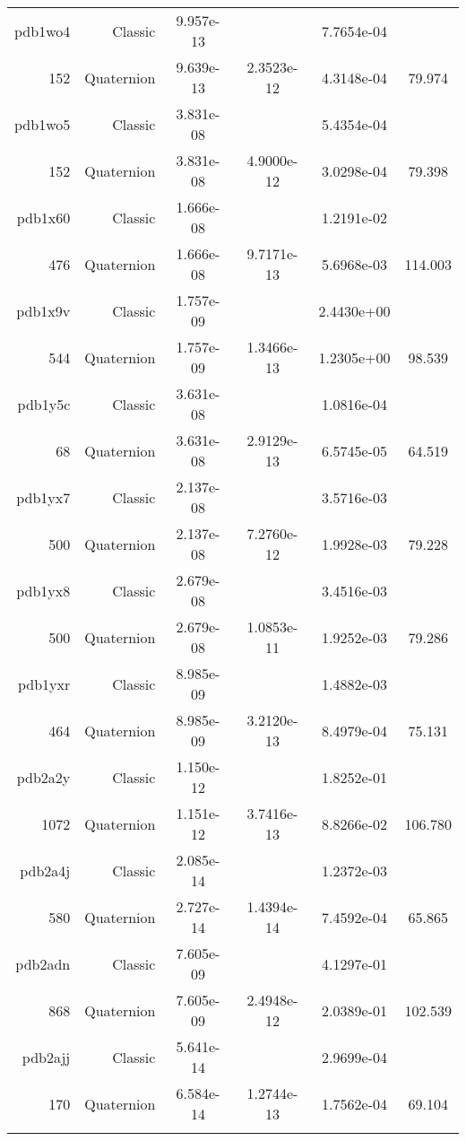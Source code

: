 \begin{xltabular}{\textwidth}{r|rS[table-format=1.3e+2]S[table-format=1.4e+2]S[table-format=1.4e+2]S[table-format=-1.3]}
pdb1wo4 & Classic & 9.957e-13 &  & 7.7654e-04 & \\
152 & Quaternion & 9.639e-13 & 2.3523e-12 & 4.3148e-04 & 79.974\\  \addlinespace
pdb1wo5 & Classic & 3.831e-08 &  & 5.4354e-04 & \\
152 & Quaternion & 3.831e-08 & 4.9000e-12 & 3.0298e-04 & 79.398\\  \addlinespace
pdb1x60 & Classic & 1.666e-08 &  & 1.2191e-02 & \\
476 & Quaternion & 1.666e-08 & 9.7171e-13 & 5.6968e-03 & 114.003\\  \addlinespace
pdb1x9v & Classic & 1.757e-09 &  & 2.4430e+00 & \\
544 & Quaternion & 1.757e-09 & 1.3466e-13 & 1.2305e+00 & 98.539\\  \addlinespace
pdb1y5c & Classic & 3.631e-08 &  & 1.0816e-04 & \\
68 & Quaternion & 3.631e-08 & 2.9129e-13 & 6.5745e-05 & 64.519\\  \addlinespace
pdb1yx7 & Classic & 2.137e-08 &  & 3.5716e-03 & \\
500 & Quaternion & 2.137e-08 & 7.2760e-12 & 1.9928e-03 & 79.228\\  \addlinespace
pdb1yx8 & Classic & 2.679e-08 &  & 3.4516e-03 & \\
500 & Quaternion & 2.679e-08 & 1.0853e-11 & 1.9252e-03 & 79.286\\  \addlinespace
pdb1yxr & Classic & 8.985e-09 &  & 1.4882e-03 & \\
464 & Quaternion & 8.985e-09 & 3.2120e-13 & 8.4979e-04 & 75.131\\  \addlinespace
pdb2a2y & Classic & 1.150e-12 &  & 1.8252e-01 & \\
1072 & Quaternion & 1.151e-12 & 3.7416e-13 & 8.8266e-02 & 106.780\\  \addlinespace
pdb2a4j & Classic & 2.085e-14 &  & 1.2372e-03 & \\
580 & Quaternion & 2.727e-14 & 1.4394e-14 & 7.4592e-04 & 65.865\\  \addlinespace
pdb2adn & Classic & 7.605e-09 &  & 4.1297e-01 & \\
868 & Quaternion & 7.605e-09 & 2.4948e-12 & 2.0389e-01 & 102.539\\  \addlinespace
pdb2ajj & Classic & 5.641e-14 &  & 2.9699e-04 & \\
170 & Quaternion & 6.584e-14 & 1.2744e-13 & 1.7562e-04 & 69.104\\  \addlinespace

\end{xltabular}

